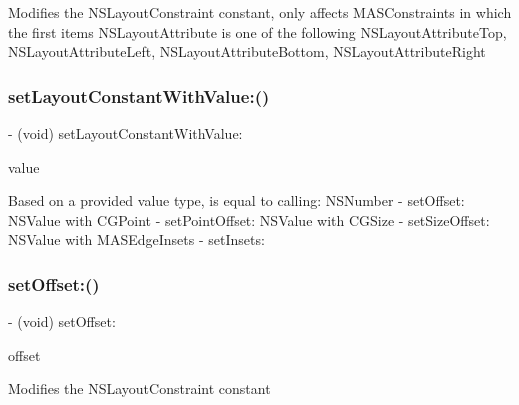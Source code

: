 Modifies the N\+S\+Layout\+Constraint constant, only affects M\+A\+S\+Constraints in which the first item\textquotesingle{}s N\+S\+Layout\+Attribute is one of the following N\+S\+Layout\+Attribute\+Top, N\+S\+Layout\+Attribute\+Left, N\+S\+Layout\+Attribute\+Bottom, N\+S\+Layout\+Attribute\+Right \mbox{\label{interface_m_a_s_constraint_a525bc5fb4cf23a6106155ffbcd774a4b}} 
\subsubsection{\texorpdfstring{set\+Layout\+Constant\+With\+Value\+:()}{setLayoutConstantWithValue:()}}
{\footnotesize\ttfamily -\/ (void) set\+Layout\+Constant\+With\+Value\+: \begin{DoxyParamCaption}\item[{(N\+S\+Value $\ast$)}]{value }\end{DoxyParamCaption}\hspace{0.3cm}{\ttfamily [implementation]}}

Based on a provided value type, is equal to calling\+: N\+S\+Number -\/ set\+Offset\+: N\+S\+Value with C\+G\+Point -\/ set\+Point\+Offset\+: N\+S\+Value with C\+G\+Size -\/ set\+Size\+Offset\+: N\+S\+Value with M\+A\+S\+Edge\+Insets -\/ set\+Insets\+: \mbox{\label{interface_m_a_s_constraint_a7840a911eea9f3e228b85934189b0eb8}} 
\subsubsection{\texorpdfstring{set\+Offset\+:()}{setOffset:()}}
{\footnotesize\ttfamily -\/ (void) set\+Offset\+: \begin{DoxyParamCaption}\item[{(C\+G\+Float)}]{offset }\end{DoxyParamCaption}}

Modifies the N\+S\+Layout\+Constraint constant \mbox{\label{interface_m_a_s_constraint_ad407b5aceff068cf40877a3a25584b02}} 
